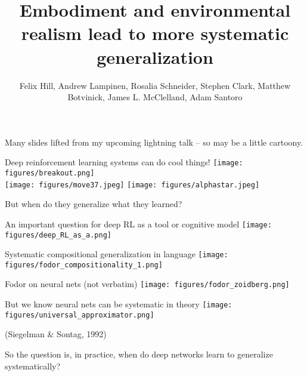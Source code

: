 \documentclass{beamer}
\begin{document}
\title{Embodiment and environmental realism lead to more systematic generalization}
\author{Felix Hill, Andrew Lampinen, Rosalia Schneider, Stephen Clark, Matthew Botvinick, James L. McClelland, Adam Santoro}
\date{}
\frame{\titlepage}

\begin{frame}[standout]
Many slides lifted from my upcoming lightning talk -- so may be a little cartoony.
\end{frame}

\begin{frame}{Deep reinforcement learning systems can do cool things!}
\vspace{0.5em}
\centering
\texttt{[image: figures/breakout.png]}\\[-2pt]
\texttt{[image: figures/move37.jpeg]}%
\texttt{[image: figures/alphastar.jpeg]}
\end{frame}

\begin{frame}[standout]
But when do they generalize what they learned? 
\end{frame}

\begin{frame}{An important question for deep RL as a tool or cognitive model}
\centering
\texttt{[image: figures/deep\_RL\_as\_a.png]}
\end{frame}

\begin{frame}{Systematic compositional generalization in language}
\vspace{-2em}
\centering
\texttt{[image: figures/fodor\_compositionality\_1.png]}
\end{frame}

\begin{frame}{Fodor on neural nets (not verbatim)}
\centering
\texttt{[image: figures/fodor\_zoidberg.png]}
\end{frame}


\begin{frame}{But we know neural nets can be systematic in theory}
\vspace{5em}
{
\centering
\texttt{[image: figures/universal\_approximator.png]}
}
\vspace{3em}

{\small (Siegelman \& Sontag, 1992)}
\end{frame}

\begin{frame}[standout]
So the question is, in practice, when do deep networks learn to generalize systematically? 
\end{frame}
\end{document}
